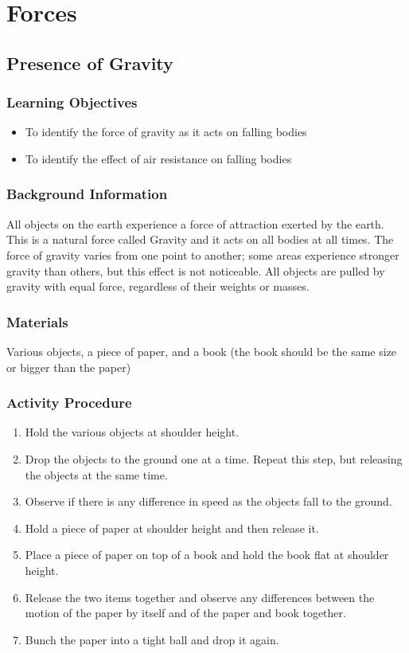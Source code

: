 \section{Forces}

\subsection{Presence of Gravity}

\subsubsection*{Learning Objectives}
\begin{itemize}
\item{To identify the force of gravity as it acts on falling bodies} 
\item{To identify the effect of air resistance on falling bodies} 
\end{itemize}

\subsubsection*{Background Information}
All objects on the earth experience a force of attraction exerted by the earth.  This is a natural force called Gravity and it acts on all bodies at all times.  The force of gravity varies from one point to another; some areas experience stronger gravity than others, but this effect is not noticeable.  All objects are pulled by gravity with equal force, regardless of their weights or masses.

\subsubsection*{Materials}
Various objects, a piece of paper, and a book (the book should be the same size or bigger than the paper)

\subsubsection*{Activity Procedure}
\begin{enumerate}
\item{Hold the various objects at shoulder height.} 
\item{Drop the objects to the ground one at a time. Repeat this step, but releasing the objects at the same time.} 
\item{Observe if there is any difference in speed as the objects fall to the ground.} 
\item{Hold a piece of paper at shoulder height and then release it.} 
\item{Place a piece of paper on top of a book and hold the book flat at shoulder height.} 
\item{Release the two items together and observe any differences between the motion of the paper by itself and of the paper and book together.} 
\item{Bunch the paper into a tight ball and drop it again.}
\end{enumerate}

